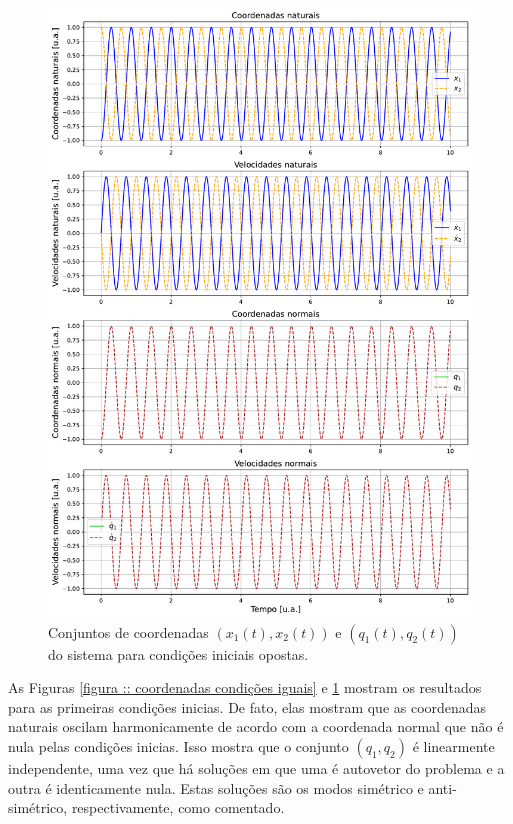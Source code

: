 \documentclass[a4paper, 11pt]{article}
\begin{document}
    
    
    \begin{figure}[h!]
        \centering
        \includegraphics[width=1\linewidth]{graph_coordenadas_opostas.pdf}
        \caption{Conjuntos de coordenadas $(x_1(t),x_2(t))$ e $(q_1(t),q_2(t))$ do sistema para condições iniciais opostas.
        \label{figura :: coordenadas condições opostas}}
    \end{figure}

    As Figuras \ref{figura :: coordenadas condições iguais} e \ref{figura :: coordenadas condições opostas} mostram os resultados para as primeiras condições inicias. De fato, elas mostram que as coordenadas naturais oscilam harmonicamente de acordo com a coordenada normal que não é nula pelas condições inicias. Isso mostra que o conjunto $(q_1,q_2)$ é linearmente independente, uma vez que há soluções em que uma é autovetor do problema e a outra é identicamente nula. Estas soluções são os modos simétrico e anti-simétrico, respectivamente, como comentado.
\end{document}
